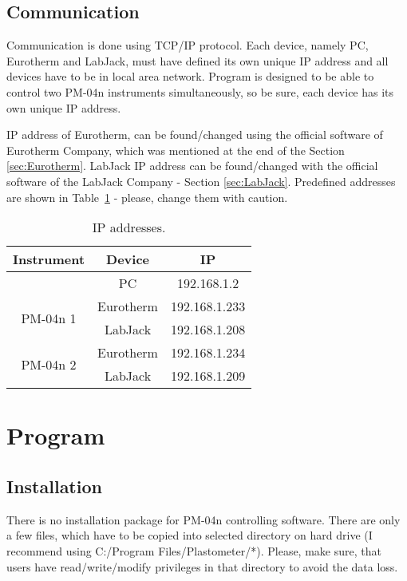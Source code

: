 \documentclass[a4paper,11pt,twoside]{book}
\theoremstyle{named}
\begin{document}
\section{Communication}
\label{sec:Communication}

Communication is done using TCP/IP protocol. Each device, namely PC,
Eurotherm and LabJack, must have defined its own unique IP address and all
devices have to be in local area network. Program is designed to be able to
control two PM-04n instruments simultaneously, so be sure, each device has its
own unique IP address. 

IP address of Eurotherm, can be found/changed using the official software of
Eurotherm Company, which was mentioned at the end of the Section
\ref{sec:Eurotherm}. LabJack IP address can be found/changed with the official
software of the LabJack Company - Section \ref{sec:LabJack}. Predefined
addresses are shown in Table~\ref{tab:IPAddresses} - please, change them with
caution. 

\begin{table}
  \centering
  \begin{tabular}{|c|c|c|}
    \hline
    Instrument  & Device & IP  \\
    \hline \hline
                              & PC & 192.168.1.2 \\
    \hline
    \multirow{2}{*}{PM-04n 1} & Eurotherm & 192.168.1.233 \\
                              & LabJack   & 192.168.1.208 \\
    \hline
    \multirow{2}{*}{PM-04n 2} & Eurotherm & 192.168.1.234 \\
                              & LabJack   & 192.168.1.209 \\
    \hline
  \end{tabular}
  \caption{IP addresses.}
  \label{tab:IPAddresses}
\end{table}








\chapter{Program}
\label{ch:Program}

\section{Installation}

There is no installation package for PM-04n controlling software. There are only
a few files, which have to be copied into selected directory on hard drive (I
recommend using C:/Program Files/Plastometer/*). Please, make sure, that users
have read/write/modify privileges in that directory to avoid the data loss.
\end{document}
